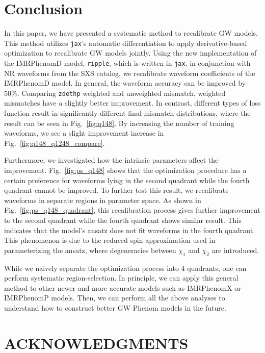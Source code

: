 \documentclass[twocolumn]{aastex631}
\newcommand{\ripple}{\texttt{ripple}}
\newcommand{\jax}{\texttt{jax}}
\newcommand{\zdethp}{\texttt{zdethp}}
\begin{document}

\section{Conclusion} \label{sec:conclusion}

In this paper, we have presented a systematic method to recalibrate GW models. This method utilizes {\jax}'s automatic differentiation to apply derivative-based optimization to recalibrate GW models jointly. Using the new implementation of the IMRPhenomD model, {\ripple}, which is written in \jax, in conjunction with NR waveforms from the SXS catalog, we recalibrate waveform coefficients of the IMRPhenomD model. In general, the waveform accuracy can be improved by 50\%. Comparing {\zdethp} weighted and unweighted mismatch, weighted mismatches have a slightly better improvement. In contrast, different types of loss function result in significantly different final mismatch distributions, where the result can be seen in Fig.~\ref{fig:q148}. By increasing the number of training waveforms, we see a slight improvement increase in Fig.~\ref{fig:q148_q1248_compare}. 

Furthermore, we investigated how the intrinsic parameters affect the improvement. Fig.~\ref{fig:ps_q148} shows that the optimization procedure has a certain preference for waveforms lying in the second quadrant while the fourth quadrant cannot be improved. To further test this result, we recalibrate waveforms in separate regions in parameter space. As shown in Fig.~\ref{fig:ps_q148_quadrant}, this recalibration process gives further improvement to the second quadrant while the fourth quadrant shows similar result. This indicates that the model's ansatz does not fit waveforms in the fourth quadrant. This phenomenon is due to the reduced spin approximation used in parameterizing the ansatz, where degeneracies between $\chi_1$ and $\chi_2$ are introduced. 

While we naively separate the optimization process into 4 quadrants, one can perform systematic region-selection. In principle, we can apply this general method to other newer and more accurate models such as IMRPhenomX or IMRPhenomP models. Then, we can perform all the above analyses to understand how to construct better GW Phenom models in the future.  



\section{ACKNOWLEDGMENTS}



\end{document}
